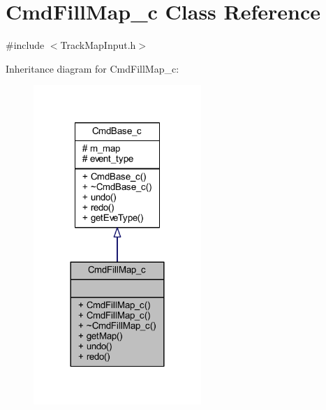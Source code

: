 \hypertarget{class_cmd_fill_map__c}{\section{Cmd\+Fill\+Map\+\_\+c Class Reference}
\label{class_cmd_fill_map__c}
}


{\ttfamily \#include $<$Track\+Map\+Input.\+h$>$}



Inheritance diagram for Cmd\+Fill\+Map\+\_\+c\+:\nopagebreak
\begin{figure}[H]
\begin{center}
\leavevmode
\includegraphics[width=180pt]{class_cmd_fill_map__c__inherit__graph}
\end{center}
\end{figure}


